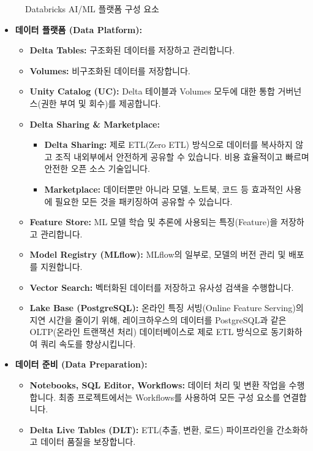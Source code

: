 \documentclass[11pt,a4paper]{article}
\theoremstyle{definition}
\begin{document}
\begin{figure}[h!]
    \centering
    \caption{Databricks AI/ML 플랫폼 구성 요소}
    \label{fig:databricks_platform}
\end{figure}

\begin{itemize}
    \item \textbf{데이터 플랫폼 (Data Platform):}
    \begin{itemize}
        \item \textbf{Delta Tables:} 구조화된 데이터를 저장하고 관리합니다.
        \item \textbf{Volumes:} 비구조화된 데이터를 저장합니다.
        \item \textbf{Unity Catalog (UC):} Delta 테이블과 Volumes 모두에 대한 통합 거버넌스(권한 부여 및 회수)를 제공합니다.
        \item \textbf{Delta Sharing & Marketplace:}
        \begin{itemize}
            \item \textbf{Delta Sharing:} 제로 ETL(Zero ETL) 방식으로 데이터를 복사하지 않고 조직 내외부에서 안전하게 공유할 수 있습니다. 비용 효율적이고 빠르며 안전한 오픈 소스 기술입니다.
            \item \textbf{Marketplace:} 데이터뿐만 아니라 모델, 노트북, 코드 등 효과적인 사용에 필요한 모든 것을 패키징하여 공유할 수 있습니다.
        \end{itemize}
        \item \textbf{Feature Store:} ML 모델 학습 및 추론에 사용되는 특징(Feature)을 저장하고 관리합니다.
        \item \textbf{Model Registry (MLflow):} MLflow의 일부로, 모델의 버전 관리 및 배포를 지원합니다.
        \item \textbf{Vector Search:} 벡터화된 데이터를 저장하고 유사성 검색을 수행합니다.
        \item \textbf{Lake Base (PostgreSQL):} 온라인 특징 서빙(Online Feature Serving)의 지연 시간을 줄이기 위해, 레이크하우스의 데이터를 PostgreSQL과 같은 OLTP(온라인 트랜잭션 처리) 데이터베이스로 제로 ETL 방식으로 동기화하여 쿼리 속도를 향상시킵니다.
    \end{itemize}

    \item \textbf{데이터 준비 (Data Preparation):}
    \begin{itemize}
        \item \textbf{Notebooks, SQL Editor, Workflows:} 데이터 처리 및 변환 작업을 수행합니다. 최종 프로젝트에서는 Workflows를 사용하여 모든 구성 요소를 연결합니다.
        \item \textbf{Delta Live Tables (DLT):} ETL(추출, 변환, 로드) 파이프라인을 간소화하고 데이터 품질을 보장합니다.
    \end{itemize}


\end{itemize}
\end{document}
